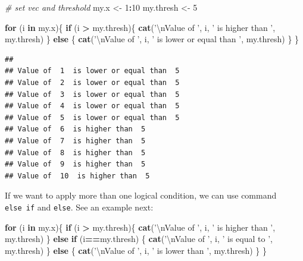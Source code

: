 \documentclass[11pt,]{book}
\newenvironment{Shaded}{\begin{snugshade}}{\end{snugshade}}
\newcommand{\KeywordTok}[1]{\textcolor[rgb]{0.27,0.27,0.27}{\textbf{#1}}}
\newcommand{\DecValTok}[1]{\textcolor[rgb]{0.06,0.06,0.06}{#1}}
\newcommand{\CharTok}[1]{\textcolor[rgb]{0.5,0.5,0.5}{#1}}
\newcommand{\StringTok}[1]{\textcolor[rgb]{0.5,0.5,0.5}{#1}}
\newcommand{\CommentTok}[1]{\textcolor[rgb]{0.56,0.35,0.01}{\textit{#1}}}
\newcommand{\ControlFlowTok}[1]{\textcolor[rgb]{0.13,0.29,0.53}{\textbf{#1}}}
\newcommand{\OperatorTok}[1]{\textcolor[rgb]{0.81,0.36,0.00}{\textbf{#1}}}
\newcommand{\NormalTok}[1]{#1}
\begin{document}
\begin{Shaded}
\begin{Highlighting}[]
\CommentTok{# set vec and threshold}
\NormalTok{my.x <-}\StringTok{ }\DecValTok{1}\OperatorTok{:}\DecValTok{10}
\NormalTok{my.thresh <-}\StringTok{ }\DecValTok{5}

\ControlFlowTok{for}\NormalTok{ (i }\ControlFlowTok{in}\NormalTok{ my.x)\{}
  \ControlFlowTok{if}\NormalTok{ (i }\OperatorTok{>}\StringTok{ }\NormalTok{my.thresh)\{}
    \KeywordTok{cat}\NormalTok{(}\StringTok{'}\CharTok{\textbackslash{}n}\StringTok{Value of '}\NormalTok{, i, }\StringTok{' is higher than '}\NormalTok{, my.thresh)}
\NormalTok{  \} }\ControlFlowTok{else}\NormalTok{ \{}
    \KeywordTok{cat}\NormalTok{(}\StringTok{'}\CharTok{\textbackslash{}n}\StringTok{Value of '}\NormalTok{, i, }\StringTok{' is lower or equal than '}\NormalTok{, my.thresh)}
\NormalTok{  \}}
\NormalTok{\}}
\end{Highlighting}
\end{Shaded}

\begin{verbatim}
## 
## Value of  1  is lower or equal than  5
## Value of  2  is lower or equal than  5
## Value of  3  is lower or equal than  5
## Value of  4  is lower or equal than  5
## Value of  5  is lower or equal than  5
## Value of  6  is higher than  5
## Value of  7  is higher than  5
## Value of  8  is higher than  5
## Value of  9  is higher than  5
## Value of  10  is higher than  5
\end{verbatim}

If we want to apply more than one logical condition, we can use command
\texttt{else\ if} and \texttt{else}. See an example next:

\begin{Shaded}
\begin{Highlighting}[]
\ControlFlowTok{for}\NormalTok{ (i }\ControlFlowTok{in}\NormalTok{ my.x)\{}
  \ControlFlowTok{if}\NormalTok{ (i }\OperatorTok{>}\StringTok{ }\NormalTok{my.thresh)\{}
    \KeywordTok{cat}\NormalTok{(}\StringTok{'}\CharTok{\textbackslash{}n}\StringTok{Value of '}\NormalTok{, i, }\StringTok{' is higher than '}\NormalTok{, my.thresh)}
\NormalTok{  \} }\ControlFlowTok{else} \ControlFlowTok{if}\NormalTok{ (i}\OperatorTok{==}\NormalTok{my.thresh) \{}
    \KeywordTok{cat}\NormalTok{(}\StringTok{'}\CharTok{\textbackslash{}n}\StringTok{Value of '}\NormalTok{, i, }\StringTok{' is equal to '}\NormalTok{, my.thresh)}
\NormalTok{  \} }\ControlFlowTok{else}\NormalTok{ \{}
    \KeywordTok{cat}\NormalTok{(}\StringTok{'}\CharTok{\textbackslash{}n}\StringTok{Value of '}\NormalTok{, i, }\StringTok{' is lower than '}\NormalTok{, my.thresh)}
\NormalTok{  \}}
\NormalTok{\}}
\end{Highlighting}
\end{Shaded}
\end{document}

